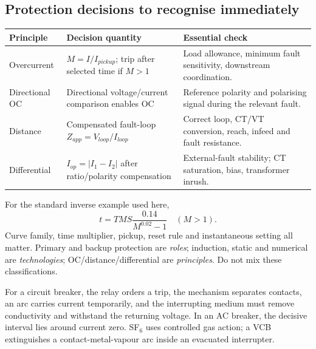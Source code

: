 \documentclass[11pt,a4paper]{article}
\begin{document}
\subsection{Protection decisions to recognise immediately}
\begin{center}\small
\begin{tabularx}{\textwidth}{L{.18\textwidth}L{.40\textwidth}Y}
\toprule Principle & Decision quantity & Essential check\\\midrule
Overcurrent & $M=I/I_{pickup}$; trip after selected time if $M>1$ & Load allowance, minimum fault sensitivity, downstream coordination.\\
Directional OC & Directional voltage/current comparison enables OC & Reference polarity and polarising signal during the relevant fault.\\
Distance & Compensated fault-loop $Z_{app}=V_{loop}/I_{loop}$ & Correct loop, CT/VT conversion, reach, infeed and fault resistance.\\
Differential & $I_{op}=|I_1-I_2|$ after ratio/polarity compensation & External-fault stability; CT saturation, bias, transformer inrush.\\\bottomrule
\end{tabularx}\end{center}
For the standard inverse example used here,
\[
 t=TMS\frac{0.14}{M^{0.02}-1}\quad(M>1).
\]
Curve family, time multiplier, pickup, reset rule and instantaneous setting all matter. Primary and backup protection are \emph{roles}; induction, static and numerical are \emph{technologies}; OC/distance/differential are \emph{principles}. Do not mix these classifications.

For a circuit breaker, the relay orders a trip, the mechanism separates contacts, an arc carries current temporarily, and the interrupting medium must remove conductivity and withstand the returning voltage. In an AC breaker, the decisive interval lies around current zero. SF$_6$ uses controlled gas action; a VCB extinguishes a contact-metal-vapour arc inside an evacuated interrupter.
\end{document}
